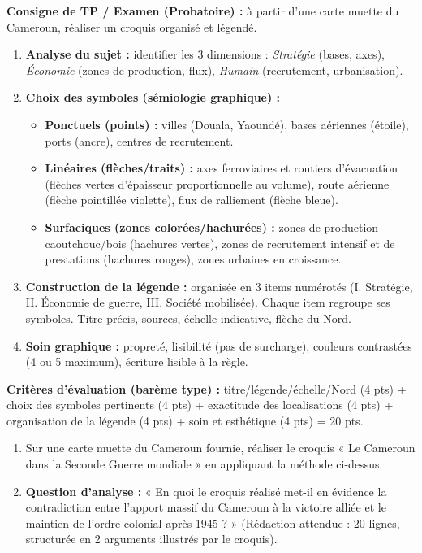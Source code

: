 \documentclass[11pt]{article}
\begin{document}
\begin{methode}
\textbf{Consigne de TP / Examen (Probatoire) :} à partir d'une carte muette du Cameroun, réaliser un croquis organisé et légendé.
\begin{enumerate}
    \item \textbf{Analyse du sujet :} identifier les 3 dimensions : \emph{Stratégie} (bases, axes), \emph{Économie} (zones de production, flux), \emph{Humain} (recrutement, urbanisation).
    \item \textbf{Choix des symboles (sémiologie graphique) :}
        \begin{itemize}
            \item \textbf{Ponctuels (points) :} villes (Douala, Yaoundé), bases aériennes (étoile), ports (ancre), centres de recrutement.
            \item \textbf{Linéaires (flèches/traits) :} axes ferroviaires et routiers d'évacuation (flèches vertes d'épaisseur proportionnelle au volume), route aérienne (flèche pointillée violette), flux de ralliement (flèche bleue).
            \item \textbf{Surfaciques (zones colorées/hachurées) :} zones de production caoutchouc/bois (hachures vertes), zones de recrutement intensif et de prestations (hachures rouges), zones urbaines en croissance.
        \end{itemize}
    \item \textbf{Construction de la légende :} organisée en 3 items numérotés (I. Stratégie, II. Économie de guerre, III. Société mobilisée). Chaque item regroupe ses symboles. Titre précis, sources, échelle indicative, flèche du Nord.
    \item \textbf{Soin graphique :} propreté, lisibilité (pas de surcharge), couleurs contrastées (4 ou 5 maximum), écriture lisible à la règle.
\end{enumerate}
\textbf{Critères d'évaluation (barème type) :} titre/légende/échelle/Nord (4 pts) + choix des symboles pertinents (4 pts) + exactitude des localisations (4 pts) + organisation de la légende (4 pts) + soin et esthétique (4 pts) = 20 pts.
\end{methode}

\begin{exercice}
\begin{enumerate}
    \item Sur une carte muette du Cameroun fournie, réaliser le croquis « Le Cameroun dans la Seconde Guerre mondiale » en appliquant la méthode ci-dessus.
    \item \textbf{Question d'analyse :} « En quoi le croquis réalisé met-il en évidence la contradiction entre l'apport massif du Cameroun à la victoire alliée et le maintien de l'ordre colonial après 1945 ? » (Rédaction attendue : 20 lignes, structurée en 2 arguments illustrés par le croquis).
\end{enumerate}
\end{exercice}
\end{document}
